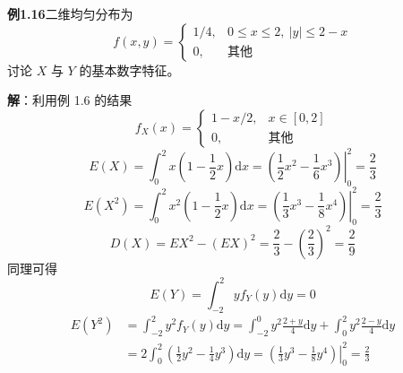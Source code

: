 \documentclass[11pt,openany,UTF8]{ctexbook}
\newcommand{\dif}{\mathrm{d}}                      %
\newcommand{\E}{E}                                 %
\begin{document}
\begin{examplebox}
\textbf{例1.16}\quad 二维均匀分布为
\[
f(x,y)=\begin{cases}
1/4, & 0\leqslant x\leqslant 2,\ \lvert y\rvert\leqslant 2-x\\
0, & \text{其他}
\end{cases}
\]
讨论 $X$ 与 $Y$ 的基本数字特征\nobreak。

\textbf{解}\nobreak：利用例 1.6 的结果
\[
f_X(x)=\begin{cases}
1-x/2, & x\in[0,2]\\
0, & \text{其他}
\end{cases}
\]
\[
\E(X)=\int_0^2 x\left(1-\frac{1}{2}x\right)\dif x
     =\left.\left(\frac{1}{2}x^2-\frac{1}{6}x^3\right)\right|_0^2=\frac{2}{3}
\]
\[
\E(X^2)=\int_0^2 x^2\left(1-\frac{1}{2}x\right)\dif x
       =\left.\left(\frac{1}{3}x^3-\frac{1}{8}x^4\right)\right|_0^2=\frac{2}{3}
\]
\[
D(X)=EX^2-(EX)^2=\frac{2}{3}-\left(\frac{2}{3}\right)^2=\frac{2}{9}
\]
同理可得
\[
\E(Y)=\int_{-2}^{2}yf_Y(y)\dif y=0
\]
\[
\begin{aligned}
\E(Y^2)&=\int_{-2}^{2}y^2f_Y(y)\dif y
        =\int_{-2}^{0}y^2\frac{2+y}{4}\dif y+\int_0^2 y^2\frac{2-y}{4}\dif y\\
&=2\int_0^2\left(\frac{1}{2}y^2-\frac{1}{4}y^3\right)\dif y
  =\left.\left(\frac{1}{3}y^3-\frac{1}{8}y^4\right)\right|_0^2=\frac{2}{3}
\end{aligned}
\]




\end{examplebox}
\end{document}

